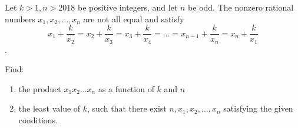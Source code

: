 Let $k > 1, n > 2018$ be positive integers, and let $n$ be odd. The nonzero rational numbers $x_1,x_2,\ldots,x_n$ are not all equal and satisfy $$x_1+\frac{k}{x_2}=x_2+\frac{k}{x_3}=x_3+\frac{k}{x_4}=\ldots=x_{n-1}+\frac{k}{x_n}=x_n+\frac{k}{x_1}$$.

Find:

\begin{enumerate}[label = (\alph*)]
	\item the product $x_1 x_2 \ldots x_n$ as a function of $k$ and $n$
	\item the least value of $k$,  such that there exist $n,x_1,x_2,\ldots,x_n$ satisfying the given conditions.
\end{enumerate}

